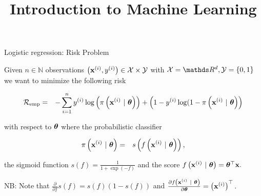\documentclass[11pt,compress,t,notes=noshow, xcolor=table]{beamer}
\title{Introduction to Machine Learning}
\begin{document}
    

\begin{vbframe}{Logistic regression: Risk Problem}

Given $n \in \mathbb{N}$ observations $\left(\mathbf{x}^{(i)}, y^{(i)}\right) \in \mathcal{X} \times \mathcal{Y}$ with  $\Xspace = \R^d, \Yspace = \{0, 1\}$ we want to minimize the following risk 


\vspace*{-0.5cm}

\begin{eqnarray*}
  \mathcal{R}_{\text{emp}}  & = & 
  -\sum^n_{i=1} y^{(i)}\log\left(\pi\left(\mathbf{x}^{(i)} ~|~ \bm{\theta}\right)\right) + \left(1-y^{(i)}\log(1-\pi\left(\mathbf{x}^{(i)} ~|~ \bm{\theta}\right)\right)
\end{eqnarray*}

with respect to $\bm{\theta}$ where the probabilistic classifier

\begin{eqnarray*}
  \pi\left(\mathbf{x}^{(i)} ~|~ \bm{\theta}\right)  & = & 
 s\left(f\left(\mathbf{x}^{(i)} ~|~ \bm{\theta}\right)\right),
\end{eqnarray*}

the sigmoid function $s(f) = \frac{1}{1 + \exp(-f)}$ and the score $f\left(\mathbf{x}^{(i)} ~|~ \bm{\theta}\right) = \bm{\theta}^\top \mathbf{x}.$

\vspace*{0.5cm} 

NB: Note that $\frac{\partial}{\partial f} s(f) = s(f)(1-s(f))$ and $\frac{\partial f\left(\mathbf{x}^{(i)} ~|~ \bm{\theta}\right)}{\partial \bm{\theta}} = \left(\mathbf{x}^{(i)}\right)^\top.$

\end{vbframe}
\end{document}
